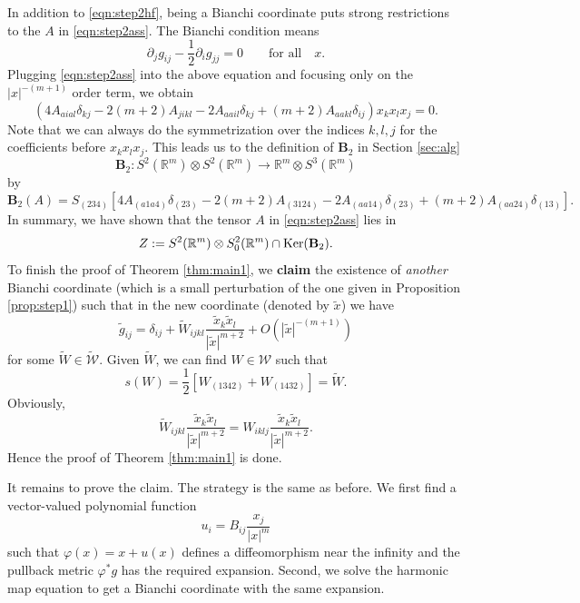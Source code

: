 \documentclass{amsart}
\newcommand{\abs}[1]{\left\vert#1\right\vert}
\newcommand{\Real}{\mathbb R}
\numberwithin{equation}{section}
\begin{document}
In addition to \eqref{eqn:step2hf}, being a Bianchi coordinate puts strong restrictions to the $A$ in \eqref{eqn:step2ass}. The Bianchi condition means
\[
	\partial_j g_{ij} -\frac{1}{2} \partial_i g_{jj}=0 \qquad \text{for all} \quad x.
\]
Plugging \eqref{eqn:step2ass} into the above equation  and focusing only on the $\abs{x}^{-(m+1)}$ order term, we obtain
\[
	\left( 4A_{aial}\delta_{kj} -2(m+2)A_{jikl}-2A_{aail}\delta_{kj}+(m+2)A_{aakl}\delta_{ij} \right)x_kx_lx_j=0.
\]
Note that we can always do the symmetrization over the indices $k,l,j$ for the coefficients before $x_kx_lx_j$. This leads us to the definition of ${\mathbf B}_2$ in Section \ref{sec:alg}
\[
	{\mathbf B}_2: S^2(\Real^m)\otimes S^2(\Real^m)\to \Real^m \otimes S^3(\Real^m)
\]
by
\[
	{\mathbf B}_2(A)= S_{(234)}[4A_{(a1a4)}\delta_{(23)}-2(m+2)A_{(3124)}-2A_{(aa14)}\delta_{(23)}+(m+2)A_{(aa24)}\delta_{(13)}].
\]
In summary, we have shown that the tensor $A$ in \eqref{eqn:step2ass} lies in
\[
	Z:=S^2(\Real^m)\otimes S^2_0(\Real^m) \cap {\rm Ker}({\mathbf B}_2).
\]
To finish the proof of Theorem \ref{thm:main1}, we {\bf claim} the existence of {\it another} Bianchi coordinate (which is a small perturbation of the one given in Proposition \ref{prop:step1}) such that in the new coordinate (denoted by $\tilde{x}$) we have
\begin{equation}
	\label{eqn:1goal}
	\tilde{g}_{ij}=\delta_{ij}+ \tilde{W}_{ijkl}\frac{\tilde{x}_k\tilde{x}_l}{\abs{\tilde{x}}^{m+2}} + O(\abs{\tilde{x}}^{-(m+1)})
\end{equation}
for some $\tilde{W}\in \widetilde{\mathcal W}$. Given $\tilde{W}$, we can find $W\in \mathcal W $ such that
\[
	s(W)=\frac{1}{2}[W_{(1342)}+W_{(1432)}]=\tilde{W}.
\]
Obviously,
\[
	\tilde{W}_{ijkl}\frac{\tilde{x}_k\tilde{x}_l}{\abs{\tilde{x}}^{m+2}} = W_{iklj}\frac{\tilde{x}_k\tilde{x}_l}{\abs{\tilde{x}}^{m+2}}.
\]
Hence the proof of Theorem \ref{thm:main1} is done. 

It remains to prove the claim. The strategy is the same as before. We first find a vector-valued polynomial function
\begin{equation}
	\label{eqn:uiB}
	u_i= B_{ij}\frac{x_j}{\abs{x}^{m}}
\end{equation}
such that $\varphi(x)=x+u(x)$ defines a diffeomorphism near the infinity and the pullback metric $\varphi^*g$ has the required expansion. Second, we solve the harmonic map equation to get a Bianchi coordinate with the same expansion.
\end{document}
